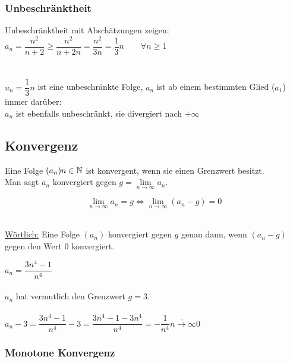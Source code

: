 \documentclass[../MAIN/main.tex]{subfiles}
\begin{document}
		\subsubsection{Unbeschränktheit}

\begin{Beispiel}
Unbeschränktheit mit Abschätzungen zeigen:\\
$a_n=\dfrac{n^2}{n+2}\geq\dfrac{n^2}{n+2n}=\dfrac{n^2}{3n}=\dfrac{1}{3}n\qquad\forall n\geq1$\\\\
\\$u_n=\dfrac{1}{3}n$ ist eine unbeschränkte Folge, $a_n$ ist ab einem bestimmten Glied ($a_1$) immer darüber:
\\$a_n$ ist ebenfalls unbeschränkt, sie divergiert nach $+\infty$
\end{Beispiel}


	\subsection{Konvergenz}

\begin{Definition}
Eine Folge $(a_n)n\in\mathbb{N}$ ist konvergent, wenn sie einen Grenzwert besitzt.\\
Man sagt $a_n$ konvergiert gegen $g=\lim\limits_{n\to\infty}a_n$.
\end{Definition}



\begin{Theorem}

$$\lim\limits_{n\to\infty}a_n=g\Leftrightarrow \lim\limits_{n\to\infty}(a_n-g)=0$$
\end{Theorem}
\\
\underline{Wörtlich:} Eine Folge $(a_n)$ konvergiert gegen $g$ genau dann, wenn $(a_n-g)$ gegen den Wert $0$ konvergiert.

\begin{Beispiel}
$a_n=\dfrac{3n^4-1}{n^4}$\\\\
$a_n$ hat vermutlich den Grenzwert $g=3$.\\\\
$a_n-3=\dfrac{3n^4-1}{n^4}-3=\dfrac{3n^4-1-3n^4}{n^4}=-\dfrac{1}{n^4}\underrightarrow{n\rightarrow \infty}0$
\end{Beispiel}
\subsubsection{Monotone Konvergenz}
\end{document}
